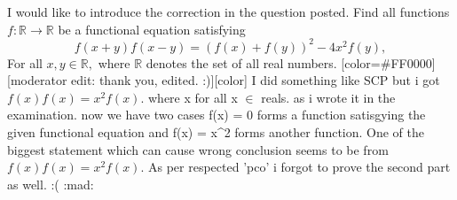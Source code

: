 \begin{solution}
\end{solution}



\begin{solution}
	I would like to introduce the correction in the question posted.
Find all functions $f:\mathbb{R}\to \mathbb R$ be a functional equation satisfying
\[f(x+y)f(x-y)=\left(f(x)+f(y)\right)^2-4x^2f(y),\]
For all $x,y\in\mathbb R,$ where $\mathbb R$ denotes the set of all real numbers.
[color=#FF0000][moderator edit: thank you, edited. :)][\/color]
I did something like SCP but i got
$f(x)f(x)= x^2f(x)$. where x for all x $\in$ reals. as i wrote it in the examination.
now we have two cases f(x) = 0 forms a function satisgying the given functional equation and f(x) = x^2 forms another function. 
One of the biggest statement which can cause wrong conclusion seems to be from $f(x)f(x)= x^2f(x)$.
As per respected 'pco' i forgot to prove the second part as well. :(  :mad:
\end{solution}



